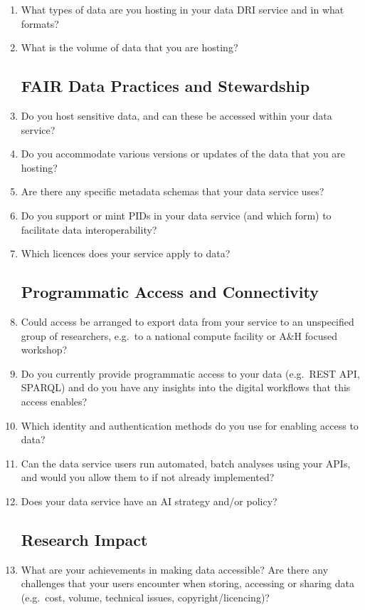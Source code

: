\documentclass[11pt]{scrartcl}
\begin{document}
\begin{enumerate}

\item What types of data are you hosting in your  data  DRI service and in what formats?    
\item What is the volume of data that you are hosting?    
\subsection*{FAIR Data Practices and Stewardship}
\item Do you host sensitive data, and can these be accessed within your data service?
 \item Do you accommodate various versions or updates of the data that you are hosting?
 \item Are there any specific metadata schemas that your data service uses?
 \item Do you support or mint PIDs in your data service (and which form) to facilitate data interoperability?
 \item Which licences does your service apply to data?

\subsection*{Programmatic Access and Connectivity}
 \item Could access be arranged to export data from your service to an unspecified group of researchers, e.g.\ to a national compute facility or A\&H focused workshop?
\item Do you currently provide programmatic access to your data (e.g.\ REST API, SPARQL) and do you have any insights into the digital workflows that this access enables?
 \item Which identity and authentication methods do you use for enabling access to data?
\item Can the data service users run automated, batch analyses using your APIs, and would you allow them to if not already implemented?
 \item Does your data service have an AI strategy and/or policy?
 
\subsection*{Research Impact}
 \item What are your achievements in making data accessible? Are there any challenges that your users encounter when storing, accessing or sharing data (e.g.\ cost, volume, technical issues, copyright/licencing)?
  

\end{enumerate}
\end{document}
